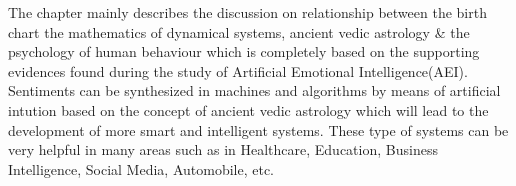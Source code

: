 The chapter mainly describes the discussion on relationship between the birth chart 
the mathematics of dynamical systems, ancient vedic astrology \& the psychology of human behaviour which is completely based on the supporting evidences found during the study of Artificial Emotional Intelligence(AEI). Sentiments can be synthesized in machines and algorithms by means of artificial intution based on the concept of ancient vedic astrology which will lead to the development of more smart and intelligent systems. These type of systems can be very helpful in many areas such as in Healthcare, Education, Business Intelligence, Social Media, Automobile, etc.